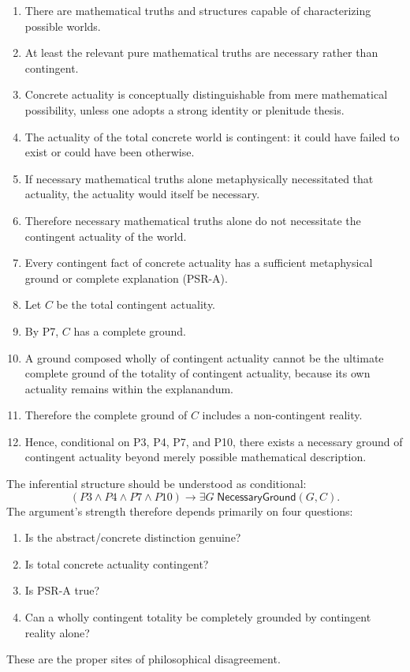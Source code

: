 \documentclass[11pt,letterpaper]{article}
\theoremstyle{plain}
\theoremstyle{definition}
\begin{document}
\begin{enumerate}[label=\textbf{P\arabic*.}, leftmargin=3.2em]
  \item There are mathematical truths and structures capable of characterizing possible worlds.
  \item At least the relevant pure mathematical truths are necessary rather than contingent.
  \item Concrete actuality is conceptually distinguishable from mere mathematical possibility, unless one adopts a strong identity or plenitude thesis.
  \item The actuality of the total concrete world is contingent: it could have failed to exist or could have been otherwise.
  \item If necessary mathematical truths alone metaphysically necessitated that actuality, the actuality would itself be necessary.
  \item Therefore necessary mathematical truths alone do not necessitate the contingent actuality of the world.
  \item Every contingent fact of concrete actuality has a sufficient metaphysical ground or complete explanation (PSR-A).
  \item Let $C$ be the total contingent actuality.
  \item By P7, $C$ has a complete ground.
  \item A ground composed wholly of contingent actuality cannot be the ultimate complete ground of the totality of contingent actuality, because its own actuality remains within the explanandum.
  \item Therefore the complete ground of $C$ includes a non-contingent reality.
  \item Hence, conditional on P3, P4, P7, and P10, there exists a necessary ground of contingent actuality beyond merely possible mathematical description.
\end{enumerate}

The inferential structure should be understood as conditional:
\[
  (P3 \land P4 \land P7 \land P10) \rightarrow \exists G\; \mathsf{NecessaryGround}(G, C).
\]
The argument's strength therefore depends primarily on four questions:
\begin{enumerate}[label=(\roman*)]
  \item Is the abstract/concrete distinction genuine?
  \item Is total concrete actuality contingent?
  \item Is PSR-A true?
  \item Can a wholly contingent totality be completely grounded by contingent reality alone?
\end{enumerate}
These are the proper sites of philosophical disagreement.
\end{document}
